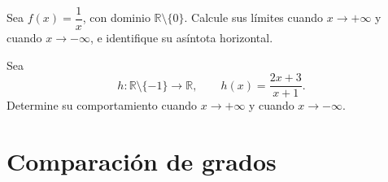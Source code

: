 \documentclass[10pt,a5paper]{article}
\newif\ifmostrarSoluciones
\begin{document}
\begin{ejemplo}
Sea $f(x)=\dfrac{1}{x}$, con dominio $\mathbb{R}\setminus\{0\}$. Calcule sus límites cuando $x\to+\infty$ y cuando $x\to-\infty$, e identifique su asíntota horizontal.
\end{ejemplo}
\ifmostrarSoluciones
\begin{solucion}
Cuando $x$ crece en valor absoluto, $1/x$ se aproxima a $0$: toma valores positivos si $x>0$ y negativos si $x<0$. Por tanto,
\[
  \lim_{x\to+\infty}\frac{1}{x}=0,
  \qquad
  \lim_{x\to-\infty}\frac{1}{x}=0.
\]
La recta $y=0$ es una asíntota horizontal.
\end{solucion}
\else\vspace{18mm}\fi

\begin{ejemplo}
Sea
\[
  h\colon\mathbb{R}\setminus\{-1\}\longrightarrow\mathbb{R},
  \qquad
  h(x)=\frac{2x+3}{x+1}.
\]
Determine su comportamiento cuando $x\to+\infty$ y cuando $x\to-\infty$.
\end{ejemplo}
\ifmostrarSoluciones
\begin{solucion}
Dividimos el numerador y el denominador entre $x$:
\[
  \frac{2x+3}{x+1}
  =\frac{2+3/x}{1+1/x}.
\]
Como
\[
  \lim_{x\to+\infty}\frac{1}{x}
  =\lim_{x\to-\infty}\frac{1}{x}
  =0,
\]
obtenemos
\[
  \lim_{x\to+\infty}\frac{2x+3}{x+1}
  =\lim_{x\to-\infty}\frac{2x+3}{x+1}
  =2.
\]
La recta $y=2$ es una asíntota horizontal.
\end{solucion}
\else\vspace{18mm}\fi

\begin{center}
\end{center}

\section*{Comparación de grados}
\end{document}
